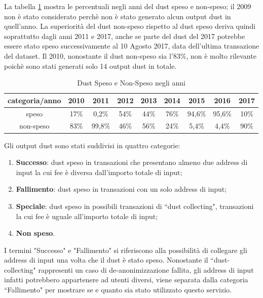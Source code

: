 La tabella \ref{tab:dust_spent_unspent} mostra le percentuali negli anni del dust speso e non-speso; il 2009 non è stato considerato perchè non è stato generato alcun output dust in quell'anno. La superiorità del dust non-speso rispetto al dust speso deriva quindi soprattutto dagli anni 2011 e 2017, anche se parte del dust del 2017 potrebbe essere stato speso successivamente al 10 Agosto 2017, data dell'ultima transazione del dataset. Il 2010, nonostante il dust non-speso sia l'83\%, non è molto rilevante poichè sono stati generati solo 14 output dust in totale. 
\begin{table}[H]
    \centering
    \begin{tabular}{|c|c|c|c|c|c|c|c|c|}
        \hline
           categoria/anno   & 2010 & 2011 & 2012 & 2013 & 2014 & 2015 & 2016 & 2017\\
        \hline 
         speso &  17\% & 0,2\% & 54\% & 44\% & 76\% & 94,6\% & 95,6\% & 10\% \\
         \hline
         non-speso & 83\% & 99,8\% & 46\% & 56\% & 24\% & 5,4\% & 4,4\% & 90\%  \\
         \hline
    \end{tabular}
    \caption{Dust Speso e Non-Speso negli anni}
    \label{tab:dust_spent_unspent}
\end{table}
Gli output dust sono stati suddivisi in quattro categorie:
\begin{enumerate}
    \item \textbf{Successo}: dust speso in transazioni che presentano almeno due address di input la cui fee è diversa dall'importo totale di input;
    \item \textbf{Fallimento}: dust speso in transazioni con un solo address di input;
    \item \textbf{Speciale}: dust speso in possibili transazioni di ``dust collecting", transazioni la cui fee è uguale all'importo totale di input;
    \item \textbf{Non speso}.
\end{enumerate}
I termini "Successo" e "Fallimento" si riferiscono alla possibilità di collegare gli address di input una volta che il dust è stato speso. Nonostante il ``dust-collecting" rappresenti un caso di de-anonimizzazione fallita, gli address di input infatti potrebbero appartenere ad utenti diversi, viene separata dalla categoria ``Fallimento" per mostrare se e quanto sia stato utilizzato questo servizio.

